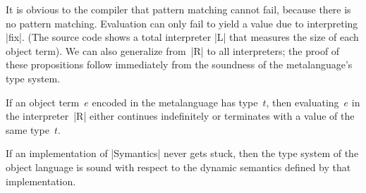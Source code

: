 It is obvious to the compiler that
%
pattern matching cannot fail, because there is no
pattern matching. Evaluation can only fail to yield a value
due to interpreting |fix|.
(The source code shows a total interpreter |L| that measures
the size of each object term).
We can also generalize from~|R| to all interpreters; the proof
of these propositions follow immediately from the soundness of the
metalanguage's type system.
\begin{proposition}
If an object term~$e$ encoded in the metalanguage has type~$t$,
then evaluating~$e$ in the interpreter~|R| either continues
indefinitely or terminates with a value of the same type~$t$.
\end{proposition}
\begin{proposition}
  If an implementation of |Symantics| never gets stuck, then
  the type system of the object
  language is sound with respect to the dynamic semantics defined by
  that implementation.
\end{proposition}
\begin{comment}
For variety, we show another interpreter, which measures the \emph{size}
of each object term, defined as the number of term
constructors. The following is slightly abbreviated code (see the
accompanying source code for the complete definition).
\begin{code}
module L = struct
  type ('c,'dv) repr = int
  let int (x:int)  = 1
  let lam f        = f 0 + 1
  let app e1 e2    = e1 + e2 + 1
  let fix f        = f 0 + 1
  let mul e1 e2    = e1 + e2 + 1
  let if_ eb et ee = eb + et () + ee () + 1
end
\end{code}
Now the expression
\begin{code}
let module E = EX(L) in E.test1 ()
\end{code}
evaluates to |3|. This interpreter is not only tagless but also
total. It ``evaluates'' even seemingly divergent terms like
\begin{code}
app (fix (fun self -> self)) (int 1)
\end{code}

module EX1(S: Symantics) = struct
 open S
 let tfix () = app (fix (fun self -> self)) (int 1)
end;;
let module E =EX1(R) in E.tfix ();;
let module E =EX1(L) in E.tfix ();;
\end{comment}

